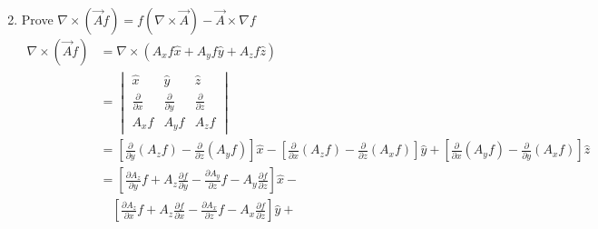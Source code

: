 \documentclass[12pt]{article}
\begin{document}
\begin{enumerate}
\begin{align*}
	      \end{align*}
	\item Prove \(\nabla \times (\vec{A}f) = f(\nabla \times \vec{A}) - \vec{A} \times \nabla f\)
	      \begin{align*}
		      \nabla \times (\vec{A}f) & = \nabla \times (A_x f \hat{x} + A_y f \hat{y} + A_z f \hat{z})                                                                                                                                                                                                                                                                                                \\
		                               & = \begin{vmatrix}
			                                   \hat{x}                     & \hat{y}                     & \hat{z}                     \\
			                                   \frac{\partial}{\partial x} & \frac{\partial}{\partial y} & \frac{\partial}{\partial z} \\
			                                   A_x f                       & A_y f                       & A_z f
		                                   \end{vmatrix}                                                                                                                                                                                                                                                                      \\
		                               & = \left[\frac{\partial}{\partial y}\left(A_z f\right) - \frac{\partial}{\partial z}\left(A_y f\right)\right] \hat{x} - \left[\frac{\partial}{\partial x}\left(A_z f\right) - \frac{\partial}{\partial z}\left(A_x f\right)\right] \hat{y} + \left[\frac{\partial}{\partial x}\left(A_y f\right) - \frac{\partial}{\partial y}\left(A_x f\right)\right] \hat{z} \\
		                               & = \left[\frac{\partial A_z}{\partial y} f + A_z \frac{\partial f}{\partial y} - \frac{\partial A_y}{\partial z} f - A_y \frac{\partial f}{\partial z}\right] \hat{x} -                                                                                                                                                                                         \\
		                               & \quad \left[\frac{\partial A_z}{\partial x} f + A_z \frac{\partial f}{\partial x} - \frac{\partial A_x}{\partial z} f - A_x \frac{\partial f}{\partial z}\right] \hat{y} +                                                                                                                                                                                     \\

\end{align*}
\end{enumerate}
\end{document}
